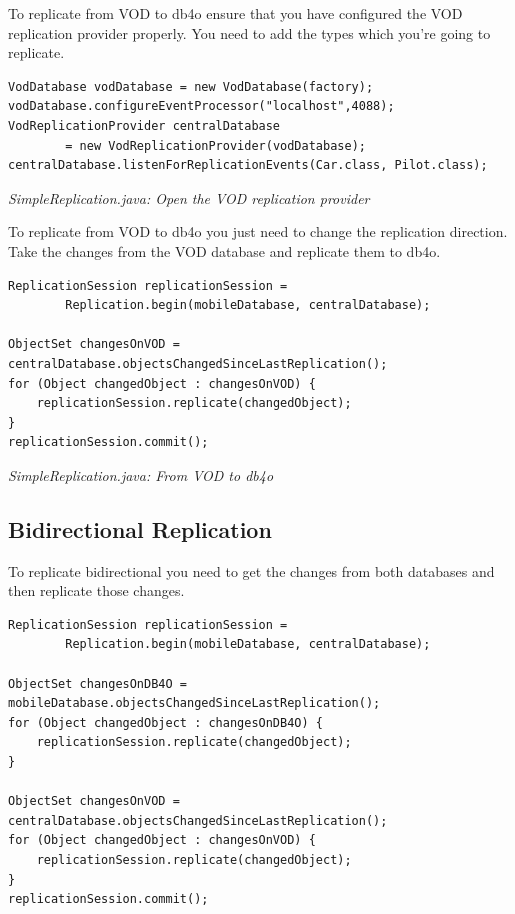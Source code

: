 To replicate from VOD to db4o ensure that you have configured the VOD replication provider properly. You need to add the types which you're going to replicate.

\begin{lstlisting}
VodDatabase vodDatabase = new VodDatabase(factory);
vodDatabase.configureEventProcessor("localhost",4088);
VodReplicationProvider centralDatabase
        = new VodReplicationProvider(vodDatabase);
centralDatabase.listenForReplicationEvents(Car.class, Pilot.class);
\end{lstlisting}

{\small\itshape SimpleReplication.java: Open the VOD replication provider\par}
\medskip

To replicate from VOD to db4o you just need to change the replication direction. Take the changes from the VOD database and replicate them to db4o.

\begin{lstlisting}
ReplicationSession replicationSession =
        Replication.begin(mobileDatabase, centralDatabase);

ObjectSet changesOnVOD = centralDatabase.objectsChangedSinceLastReplication();
for (Object changedObject : changesOnVOD) {
    replicationSession.replicate(changedObject);
}
replicationSession.commit();
\end{lstlisting}

{\small\itshape SimpleReplication.java: From VOD to db4o\par}
\medskip

\subsection{Bidirectional Replication}
\label{drs:db4o-replication-system-drs-vod-vod-replication:bidirectional}

To replicate bidirectional you need to get the changes from both databases and then replicate those changes.

\begin{lstlisting}
ReplicationSession replicationSession =
        Replication.begin(mobileDatabase, centralDatabase);

ObjectSet changesOnDB4O = mobileDatabase.objectsChangedSinceLastReplication();
for (Object changedObject : changesOnDB4O) {
    replicationSession.replicate(changedObject);
}

ObjectSet changesOnVOD = centralDatabase.objectsChangedSinceLastReplication();
for (Object changedObject : changesOnVOD) {
    replicationSession.replicate(changedObject);
}
replicationSession.commit();
\end{lstlisting}

